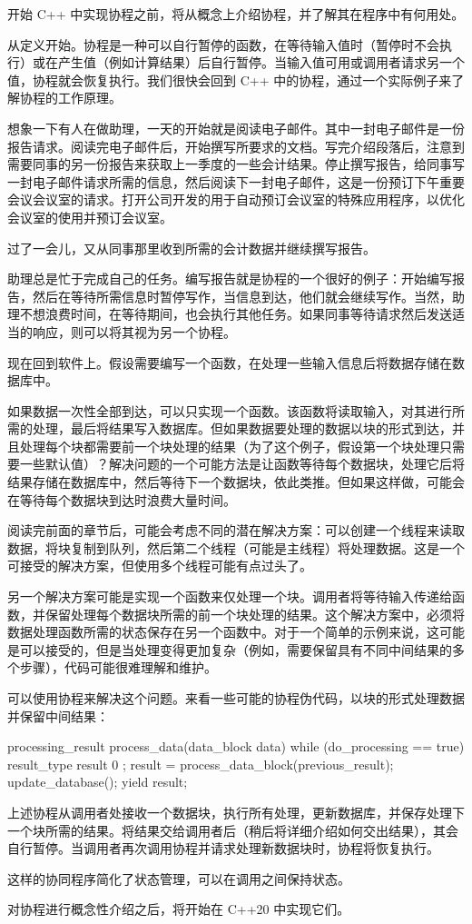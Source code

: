 开始 C++ 中实现协程之前，将从概念上介绍协程，并了解其在程序中有何用处。

从定义开始。协程是一种可以自行暂停的函数，在等待输入值时（暂停时不会执行）或在产生值（例如计算结果）后自行暂停。当输入值可用或调用者请求另一个值，协程就会恢复执行。我们很快会回到 C++ 中的协程，通过一个实际例子来了解协程的工作原理。

想象一下有人在做助理，一天的开始就是阅读电子邮件。其中一封电子邮件是一份报告请求。阅读完电子邮件后，开始撰写所要求的文档。写完介绍段落后，注意到需要同事的另一份报告来获取上一季度的一些会计结果。停止撰写报告，给同事写一封电子邮件请求所需的信息，然后阅读下一封电子邮件，这是一份预订下午重要会议会议室的请求。打开公司开发的用于自动预订会议室的特殊应用程序，以优化会议室的使用并预订会议室。

过了一会儿，又从同事那里收到所需的会计数据并继续撰写报告。

助理总是忙于完成自己的任务。编写报告就是协程的一个很好的例子：开始编写报告，然后在等待所需信息时暂停写作，当信息到达，他们就会继续写作。当然，助理不想浪费时间，在等待期间，也会执行其他任务。如果同事等待请求然后发送适当的响应，则可以将其视为另一个协程。

现在回到软件上。假设需要编写一个函数，在处理一些输入信息后将数据存储在数据库中。

如果数据一次性全部到达，可以只实现一个函数。该函数将读取输入，对其进行所需的处理，最后将结果写入数据库。但如果数据要处理的数据以块的形式到达，并且处理每个块都需要前一个块处理的结果（为了这个例子，假设第一个块处理只需要一些默认值）？解决问题的一个可能方法是让函数等待每个数据块，处理它后将结果存储在数据库中，然后等待下一个数据块，依此类推。但如果这样做，可能会在等待每个数据块到达时浪费大量时间。

阅读完前面的章节后，可能会考虑不同的潜在解决方案：可以创建一个线程来读取数据，将块复制到队列，然后第二个线程（可能是主线程）将处理数据。这是一个可接受的解决方案，但使用多个线程可能有点过头了。

另一个解决方案可能是实现一个函数来仅处理一个块。调用者将等待输入传递给函数，并保留处理每个数据块所需的前一个块处理的结果。这个解决方案中，必须将数据处理函数所需的状态保存在另一个函数中。对于一个简单的示例来说，这可能是可以接受的，但是当处理变得更加复杂（例如，需要保留具有不同中间结果的多个步骤），代码可能很难理解和维护。

可以使用协程来解决这个问题。来看一些可能的协程伪代码，以块的形式处理数据并保留中间结果：

\begin{cpp}
processing_result process_data(data_block data) {
    while (do_processing == true) {
        result_type result{ 0 };
        result = process_data_block(previous_result);
        update_database();
        yield result;
    }
}
\end{cpp}

上述协程从调用者处接收一个数据块，执行所有处理，更新数据库，并保存处理下一个块所需的结果。将结果交给调用者后（稍后将详细介绍如何交出结果），其会自行暂停。当调用者再次调用协程并请求处理新数据块时，协程将恢复执行。

这样的协同程序简化了状态管理，可以在调用之间保持状态。

对协程进行概念性介绍之后，将开始在 C++20 中实现它们。















